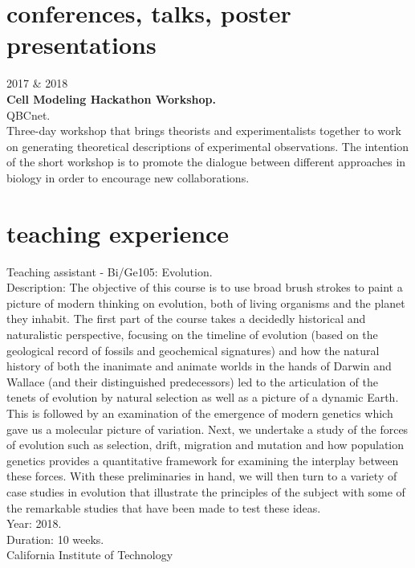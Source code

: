 \documentclass[]{friggeri-cv}
\begin{document}
\section{conferences, talks, poster presentations}

{\small{} 2017 \& 2018 }\\
\textbf{Cell Modeling Hackathon Workshop.}\\
{QBCnet.}\\
Three-day workshop that brings theorists and experimentalists together to work on generating theoretical descriptions of experimental observations. The intention of the short workshop is to promote the dialogue between different approaches in biology in order to encourage new collaborations.

\pagebreak
\section{teaching experience}

Teaching assistant - Bi/Ge105: Evolution.\\
Description: The objective of this course is to use broad brush strokes to paint a picture of modern thinking on evolution, both of living organisms and the planet they inhabit. The first part of the course takes a decidedly historical and naturalistic perspective, focusing on the timeline of evolution (based on the geological record of fossils and geochemical signatures) and how the natural history of both the inanimate and animate worlds in the hands of Darwin and Wallace (and their distinguished predecessors) led to the articulation of the tenets of evolution by natural selection as well as a picture of a dynamic Earth. This is followed by an examination of the emergence of modern genetics which gave us a molecular picture of variation. Next, we undertake a study of the forces of evolution such as selection, drift, migration and mutation and how population genetics provides a quantitative framework for examining the interplay between these forces. With these preliminaries in hand, we will then turn to a variety of case studies in evolution that illustrate the principles of the subject with some of the remarkable studies that have been made to test these ideas.\\
Year: 2018.\\
Duration: 10 weeks.\\
{California Institute of Technology}\\
\end{document}
